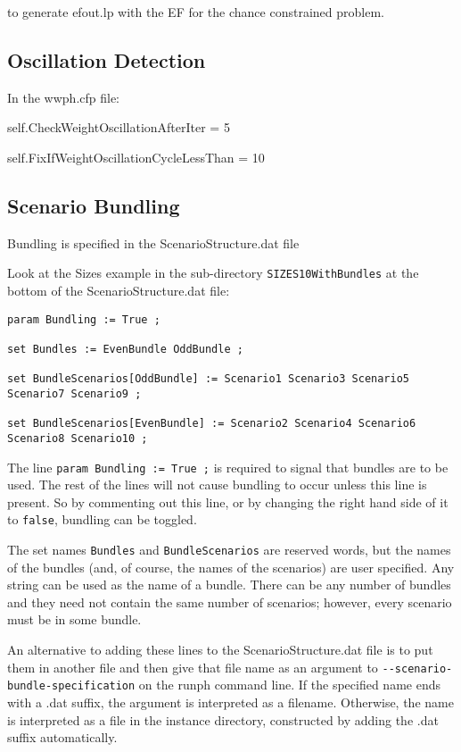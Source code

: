 to generate efout.lp with the EF for the chance constrained problem.

\subsection{Oscillation Detection}

In the wwph.cfp file:

self.CheckWeightOscillationAfterIter = 5

self.FixIfWeightOscillationCycleLessThan = 10

\subsection{Scenario Bundling}

Bundling is specified in the ScenarioStructure.dat file

Look at the Sizes example in the sub-directory \verb|SIZES10WithBundles| at the bottom
of the ScenarioStructure.dat file:

\begin{verbatim}
param Bundling := True ;

set Bundles := EvenBundle OddBundle ;

set BundleScenarios[OddBundle] := Scenario1 Scenario3 Scenario5 Scenario7 Scenario9 ;

set BundleScenarios[EvenBundle] := Scenario2 Scenario4 Scenario6 Scenario8 Scenario10 ;
\end{verbatim}

The line \verb|param Bundling := True ;| is required to signal that bundles are to be used. The rest of the lines
will not cause bundling to occur unless this line is present. So by commenting out this line, or by changing the
right hand side of it to \verb|false|, bundling can be toggled.

The set names \verb|Bundles| and \verb|BundleScenarios| are reserved words, but the names of the bundles (and, of course,
the names of the scenarios) are user specified.  Any string can be used as the name of a bundle. There can be any number of bundles and they need not contain the same number of scenarios; however, every scenario must be in some bundle.

An alternative to adding these lines to the ScenarioStructure.dat file is to put them in another file and then give
that file name as an argument to \verb|--scenario-bundle-specification| on the runph command line.
If the specified name ends with a .dat suffix, the argument is interpreted as a filename. Otherwise, the name is interpreted
as a file in the instance directory, constructed by adding the .dat suffix automatically.

